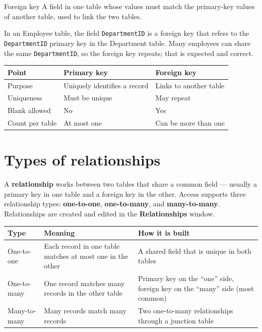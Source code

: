 \begin{definitionbox}{Foreign key}
A field in one table whose values must match the primary-key values of another
table, used to link the two tables.
\end{definitionbox}

\begin{example}
In an Employee table, the field \texttt{DepartmentID} is a foreign key that
refers to the \texttt{DepartmentID} primary key in the Department table. Many
employees can share the same \texttt{DepartmentID}, so the foreign key repeats;
that is expected and correct.
\end{example}

\begin{center}
\begin{tabular}{p{}p{}p{}}
\toprule
\textbf{Point} & \textbf{Primary key} & \textbf{Foreign key} \\
\midrule
Purpose & Uniquely identifies a record & Links to another table \\
Uniqueness & Must be unique & May repeat \\
Blank allowed & No & Yes \\
Count per table & At most one & Can be more than one \\
\bottomrule
\end{tabular}
\end{center}

\section{Types of relationships}
A \textbf{relationship} works between two tables that share a common field ---
usually a primary key in one table and a foreign key in the other. Access
supports three relationship types: \textbf{one-to-one},
\textbf{one-to-many}, and \textbf{many-to-many}. Relationships are created and
edited in the \textbf{Relationships} window.

\begin{center}
\begin{tabular}{p{}p{}p{}}
\toprule
\textbf{Type} & \textbf{Meaning} & \textbf{How it is built} \\
\midrule
One-to-one & Each record in one table matches at most one in the other & A shared field that is unique in both tables \\
One-to-many & One record matches many records in the other table & Primary key on the ``one'' side, foreign key on the ``many'' side (most common) \\
Many-to-many & Many records match many records & Two one-to-many relationships through a junction table \\
\bottomrule
\end{tabular}
\end{center}


